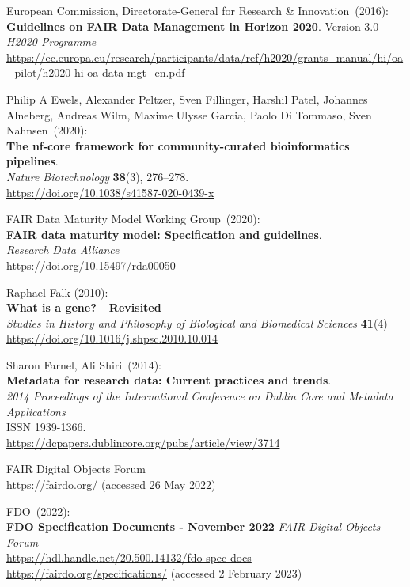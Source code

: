 \begin{thebibliography}{9}
European Commission, Directorate-General for Research \& Innovation~(2016): \\
\textbf{Guidelines on FAIR Data Management in Horizon 2020}. Version 3.0\\
\emph{H2020 Programme}\\
\url{https://ec.europa.eu/research/participants/data/ref/h2020/grants_manual/hi/oa_pilot/h2020-hi-oa-data-mgt_en.pdf}

Philip A Ewels, Alexander Peltzer, Sven Fillinger, Harshil
Patel, Johannes Alneberg, Andreas Wilm, Maxime Ulysse Garcia, Paolo Di
Tommaso, Sven Nahnsen~(2020): \\
\textbf{The nf-core framework for community-curated bioinformatics
pipelines}.\\
\emph{Nature Biotechnology} \textbf{38}(3), 276--278.\\
\url{https://doi.org/10.1038/s41587-020-0439-x}

FAIR Data Maturity Model Working Group~(2020): \\
\textbf{FAIR data maturity model: Specification and guidelines}.\\
\emph{Research Data Alliance}\\
\url{https://doi.org/10.15497/rda00050}

Raphael Falk (2010):\\
\textbf{What is a gene?—Revisited} \\
\emph{Studies in History and Philosophy of Biological and Biomedical Sciences} \textbf{41}(4) \\ 
\url{https://doi.org/10.1016/j.shpsc.2010.10.014}

Sharon Farnel, Ali Shiri~(2014): \\
\textbf{Metadata for research data: Current practices and trends}.\\
\emph{2014 Proceedings of the International Conference on Dublin Core
and Metadata Applications}\\
ISSN 1939-1366.\\
\url{https://dcpapers.dublincore.org/pubs/article/view/3714}

{FAIR Digital Objects Forum} \\
\url{https://fairdo.org/} (accessed 26 May 2022)

FDO~(2022): \\
\textbf{{FDO Specification Documents - November 2022}}
\emph{FAIR Digital Objects Forum}\\
\url{https://hdl.handle.net/20.500.14132/fdo-spec-docs}\\
\url{https://fairdo.org/specifications/} 
(accessed 2 February 2023) 


\end{thebibliography}

